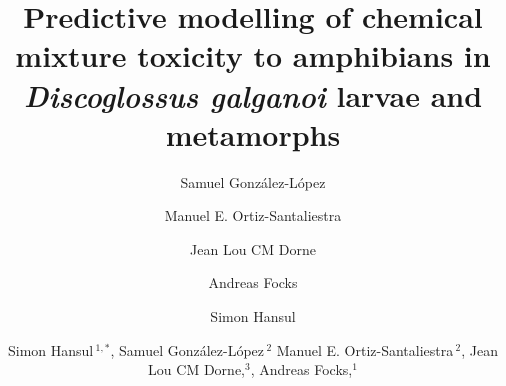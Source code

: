 \documentclass[utf8]{FrontiersinHarvard} %
\author[UCLM]{Samuel González-López}
\author[UCLM]{Manuel E. Ortiz-Santaliestra}
\author[EFSA]{Jean Lou CM Dorne}
\author[UOS]{Andreas Focks}
\def\firstAuthorLast{Hansul {et~al.}} %
\def\Authors{Simon Hansul\,$^{1,*}$, Samuel González-López\,$^{2}$ Manuel E. Ortiz-Santaliestra\,$^{2}$, Jean Lou CM Dorne,$^{3}$, Andreas Focks,$^1$}
\begin{document}
\onecolumn
{}

\title[Predictive modelling mixture toxicity]{Predictive modelling of chemical mixture toxicity to amphibians in \textit{Discoglossus galganoi}
    larvae and metamorphs} 

\author[UOS]{Simon Hansul}

\author[\firstAuthorLast ]{\Authors} %
\address{} %
\correspondance{} %

\extraAuth{}%


\maketitle
\end{document}
